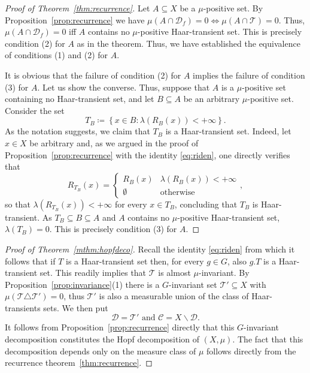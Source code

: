 \documentclass{amsart}
\numberwithin{equation}{subsection}
\begin{document}
\begin{proof}[Proof of Theorem~\ref{thm:recurrence}]
Let \(A\subseteq X\) be a \(\mu\)-positive set. By Proposition~\ref{prop:recurrence} we have \(\mu\left(A\cap\mathcal{D}_{f}\right)=0\iff\mu\left(A\cap\mathcal{T}\right)=0\). Thus, \(\mu\left(A\cap\mathcal{D}_{f}\right)=0\) iff \(A\) contains no \(\mu\)-positive Haar-transient set. This is precisely condition (2) for \(A\) as in the theorem. Thus, we have established the equivalence of conditions (1) and (2) for \(A\).

It is obvious that the failure of condition (2) for \(A\) implies the failure of condition (3) for \(A\). Let us show the converse. Thus, suppose that \(A\) is a \(\mu\)-positive set containing no Haar-transient set, and let \(B\subseteq A\) be an arbitrary \(\mu\)-positive set. Consider the set
\[T_{B}\coloneqq \left\{x\in B:\lambda\left(R_{B}\left(x\right)\right)<+\infty\right\}.\]
As the notation suggests, we claim that \(T_{B}\) is a Haar-transient set. Indeed, let \(x\in X\) be arbitrary and, as we argued in the proof of Proposition~\ref{prop:recurrence} with the identity \eqref{eq:riden}, one directly verifies that
\[R_{T_{B}}\left(x\right)=\begin{cases}
R_{B}\left(x\right) & \lambda\left(R_{B}\left(x\right)\right)<+\infty\\
\emptyset & \text{otherwise}
\end{cases},\]
so that \(\lambda\left(R_{T_{B}}\left(x\right)\right)<+\infty\) for every \(x\in T_{B}\), concluding that \(T_{B}\) is Haar-transient. As \(T_{B}\subseteq B\subseteq A\) and \(A\) contains no \(\mu\)-positive Haar-transient set, \(\lambda\left(T_{B}\right)=0\). This is precisely condition (3) for \(A\).
\end{proof}

\begin{proof}[Proof of Theorem~\ref{mthm:hopfdeco}]
Recall the identity \eqref{eq:riden} from which it follows that if \(T\) is a Haar-transient set then, for every \(g\in G\), also \(g.T\) is a Haar-transient set. This readily implies that \(\mathcal{T}\) is almost \(\mu\)-invariant. By Proposition~\ref{prop:invariance}(1) there is a \(G\)-invariant set \(\mathcal{T}'\subseteq X\) with \(\mu\left(\mathcal{T}\triangle\mathcal{T}'\right)=0\), thus \(\mathcal{T}'\) is also a measurable union of the class of Haar-transients sets. We then put
\[\mathcal{D}=\mathcal{T}'\text{ and }\mathcal{C}=X\backslash \mathcal{D}.\]
It follows from Proposition~\ref{prop:recurrence} directly that this \(G\)-invariant decomposition constitutes the Hopf decomposition of \(\left(X,\mu\right)\). The fact that this decomposition depends only on the measure class of \(\mu\) follows directly from the recurrence theorem~\ref{thm:recurrence}.
\end{proof}
\end{document}
